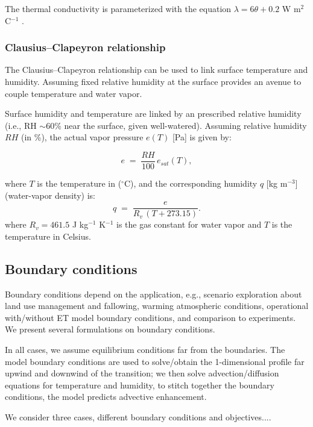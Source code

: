 \documentclass{article}
\begin{document}
    The thermal conductivity is parameterized with the equation $\lambda = 6 \theta + 0.2 $ W m$^2$ C$^{-1}$ \cite{xiong2023new}.

    \subsubsection{Clausius--Clapeyron relationship}

    The Clausius--Clapeyron relationship can be used to link surface temperature and humidity.
    Assuming fixed relative humidity at the surface provides an avenue to couple temperature and water vapor. 

    Surface humidity and temperature are linked by an prescribed relative humidity (i.e., RH  $\sim$60\% near the surface, given well-watered).  Assuming relative humidity $RH$ (in \%), the actual vapor pressure $e(T)$ [Pa] is given by:

    \begin{equation}
    e \;=\; \frac{RH}{100}\,e_{sat}(T),
    \end{equation}

    where  $T$ is the temperature in  ($^\circ$C), and the corresponding  humidity   $q$ [kg m$^{-3}$] (water-vapor density) is:
    \begin{equation}
    q \;=\; \frac{e}{R_v\, (T  +273.15)}.
    \end{equation}
    where $R_v = 461.5$ J kg$^{-1}$ K$^{-1}$ is the gas constant for water vapor and $T$ is the temperature in Celsius.

    
    \subsection{Boundary conditions }

    Boundary conditions depend on the application, e.g., scenario exploration about land use management and fallowing, warming atmospheric conditions, operational with/without ET model boundary conditions, and comparison to experiments.
    We present several formulations on boundary conditions.

    
     In all cases, we assume equilibrium conditions far from the boundaries. 
     The model boundary conditions are used to solve/obtain the 1-dimensional profile far upwind and downwind of the transition;  we then solve advection/diffusion equations for temperature and humidity, to stitch together the boundary conditions, the model predicts advective enhancement.

    We consider three cases, different boundary conditions and objectives....
\end{document}
